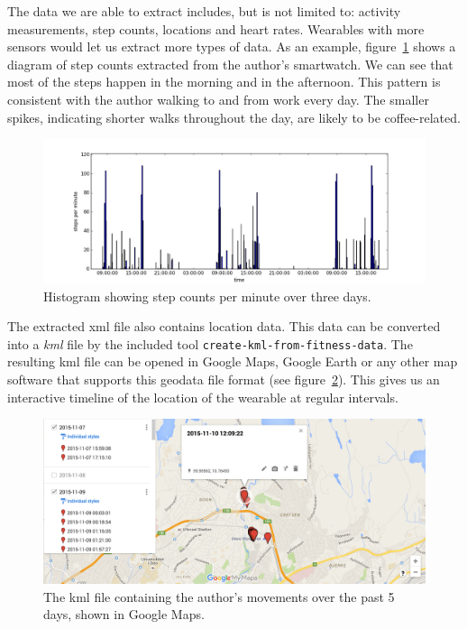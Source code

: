 \documentclass[a4paper,11pt,dvips]{article}
\begin{document}
The data we are able to extract includes, but is not limited to: activity measurements, step counts, locations and heart rates. Wearables with more sensors would let us extract more types of data. As an example, figure~\ref{fig:stepcount} shows a diagram of step counts extracted from the author's smartwatch. We can see that most of the steps happen in the morning and in the afternoon. This pattern is consistent with the author walking to and from work every day. The smaller spikes, indicating shorter walks throughout the day, are likely to be coffee-related.

\begin{figure}
\noindent
\includegraphics[natwidth=1355bp,natheight=512bp,width=\linewidth]{stepcount}
\caption{Histogram showing step counts per minute over three days.}
\label{fig:stepcount}
\end{figure}

The extracted xml file also contains location data. This data can be converted into a \textit{kml} file by the included tool \texttt{create-kml-from-fitness-data}. The resulting kml file can be opened in Google Maps, Google Earth or any other map software that supports this geodata file format (see figure~\ref{fig:geodata}). This gives us an interactive timeline of the location of the wearable at regular intervals.

\begin{figure}
\noindent
\includegraphics[natwidth=2096bp,natheight=906bp,width=\linewidth]{geodata}
\caption{The kml file containing the author's movements over the past 5 days, shown in Google Maps.}
\label{fig:geodata}
\end{figure}
\end{document}
